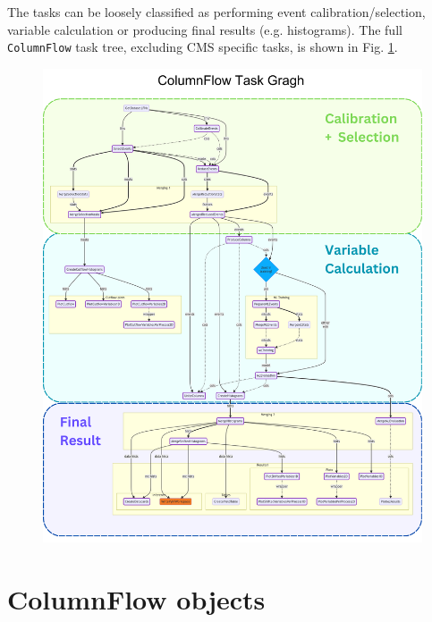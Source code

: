 The tasks can be loosely classified as performing event calibration/selection, variable calculation or producing final results (e.g. histograms). The full \texttt{ColumnFlow} task tree, excluding CMS specific tasks, is shown in Fig. \ref{fig:task_graph}.

\begin{figure}[p]
    \centering
    \includegraphics[scale=0.8]{images/CF_tasks.png}
    \caption{}
    \label{fig:task_graph}
\end{figure}

\section{ColumnFlow objects}